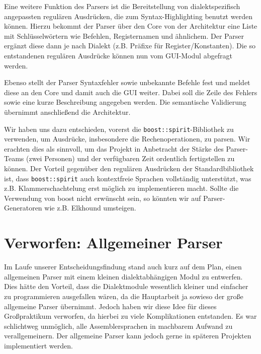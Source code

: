 Eine weitere Funktion des Parsers ist die Bereitstellung von dialektspezifisch
angepassten regulären Ausdrücken, die zum Syntax-Highlighting benutzt werden
können. Hierzu bekommt der Parser über den Core von der Architektur eine Liste
mit Schlüsselwörtern wie Befehlen, Registernamen und ähnlichem. Der Parser
ergänzt diese dann je nach Dialekt (z.B. Präfixe für Register/Konstanten). Die
so entstandenen regulären Ausdrücke können nun vom GUI-Modul abgefragt werden.

Ebenso stellt der Parser Syntaxfehler sowie unbekannte Befehle fest und meldet diese an den Core
und damit auch die GUI weiter. Dabei soll die Zeile des Fehlers sowie eine kurze Beschreibung angegeben werden.
Die semantische Validierung übernimmt anschließend die Architektur.

Wir haben uns dazu entschieden, vorerst die \lstinline[style=C++]!boost::spirit!-Bibliothek zu
verwenden, um Ausdrücke, insbesondere die Rechenoperationen, zu parsen.  Wir erachten dies als sinnvoll, um das
Projekt in Anbetracht der Stärke des Parser-Teams (zwei Personen) und der
verfügbaren Zeit ordentlich fertigstellen zu können. Der Vorteil gegenüber den
regulären Ausdrücken der Standardbibliothek ist, dass \lstinline[style=C++]!boost::spirit! auch kontextfreie Sprachen vollständig unterstützt, was z.B. Klammerschachtelung erst möglich zu implementieren macht.
Sollte die Verwendung von boost nicht erwünscht sein, so könnten wir auf Parser-Generatoren wie z.B. Elkhound umsteigen. %

\section{Verworfen: Allgemeiner Parser} Im Laufe unserer Entscheidungsfindung
stand auch kurz auf dem Plan, einen allgemeinen Parser mit einem kleinen
dialektabhängigen Modul zu entwerfen.  Dies hätte den Vorteil, dass die
Dialektmodule wesentlich kleiner und einfacher zu programmieren ausgefallen
wären, da die Hauptarbeit ja sowieso der große allgemeine Parser übernimmt.
Jedoch haben wir diese Idee für dieses Großpraktikum verworfen, da hierbei zu
viele Komplikationen entstanden. Es war schlichtweg unmöglich,
alle Assemblersprachen in machbarem Aufwand zu verallgemeinern.
Der allgemeine Parser kann jedoch gerne in späteren Projekten implementiert werden.